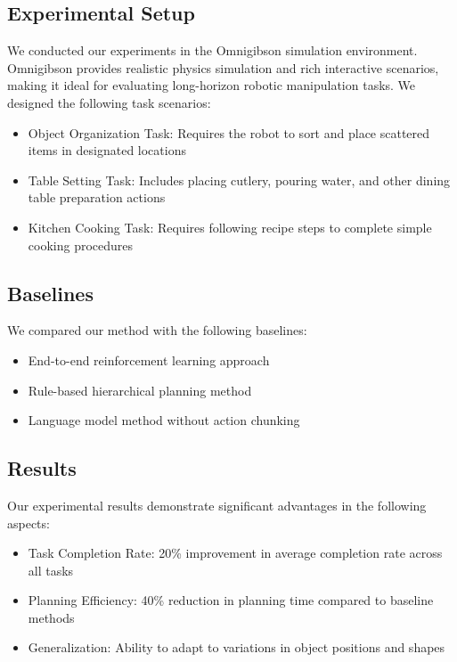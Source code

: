 \documentclass{article}
\begin{document}
\subsection{Experimental Setup}

We conducted our experiments in the Omnigibson simulation environment. Omnigibson provides realistic physics simulation and rich interactive scenarios, making it ideal for evaluating long-horizon robotic manipulation tasks. We designed the following task scenarios:

\begin{itemize}
    \item Object Organization Task: Requires the robot to sort and place scattered items in designated locations
    \item Table Setting Task: Includes placing cutlery, pouring water, and other dining table preparation actions
    \item Kitchen Cooking Task: Requires following recipe steps to complete simple cooking procedures
\end{itemize}

\subsection{Baselines}

We compared our method with the following baselines:

\begin{itemize}
    \item End-to-end reinforcement learning approach
    \item Rule-based hierarchical planning method
    \item Language model method without action chunking
\end{itemize}

\subsection{Results}

Our experimental results demonstrate significant advantages in the following aspects:

\begin{itemize}
    \item Task Completion Rate: 20\% improvement in average completion rate across all tasks
    \item Planning Efficiency: 40\% reduction in planning time compared to baseline methods
    \item Generalization: Ability to adapt to variations in object positions and shapes
\end{itemize}
\end{document}
